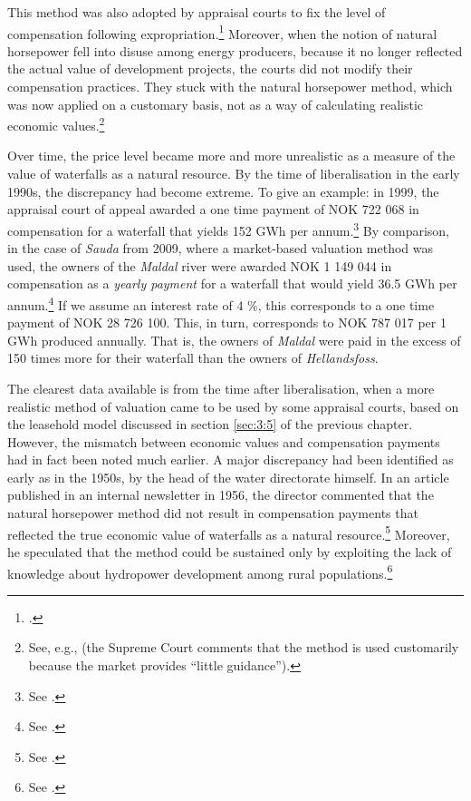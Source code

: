 This method was also adopted by appraisal courts to fix the level of compensation following expropriation.\footnote{\cite[521]{vislie02}.} Moreover, when the notion of natural horsepower fell into disuse among energy producers, because it no longer reflected the actual value of development projects, the courts did not modify their compensation practices. They stuck with the natural horsepower method, which was now applied on a customary basis, not as a way of calculating realistic economic values.\footnote{See, e.g., \cite[1599]{hellandsfoss99} (the Supreme Court comments that the method is used customarily because the market provides ``little guidance'').}

Over time, the price level became more and more unrealistic as a measure of the value of waterfalls as a natural resource. By the time of liberalisation in the early 1990s, the discrepancy had become extreme. To give an example: in 1999, the appraisal court of appeal awarded a one time payment of NOK 722 068 in compensation for a waterfall that yields 152 GWh per annum.\footnote{See \cite{hellandsfoss99}.} By comparison, in the case of {\it Sauda} from 2009, where a market-based valuation method was used, the owners of the {\it Maldal} river were awarded NOK 1 149 044 in compensation as a {\it yearly payment} for a waterfall that would yield 36.5 GWh per annum.\footnote{See \cite{sauda09}.} If we assume an interest rate of 4 \%, this corresponds to a one time payment of NOK 28 726 100. This, in turn, corresponds to NOK 787 017 per 1 GWh produced annually. That is, the owners of {\it Maldal} were paid in the excess of 150 times more for their waterfall than the owners of {\it Hellandsfoss}.

The clearest data available is from the time after liberalisation, when a more realistic method of valuation came to be used by some appraisal courts, based on the leasehold model discussed in section \ref{sec:3:5} of the previous chapter. However, the mismatch between economic values and compensation payments had in fact been noted much earlier. A major discrepancy had been identified as early as in the 1950s, by the head of the water directorate himself. In an article published in an internal newsletter in 1956, the director commented that the natural horsepower method did not result in compensation payments that reflected the true economic value of waterfalls as a natural resource.\footnote{See \cite{rogstad56}.} Moreover, he speculated that the method could be sustained only by exploiting the lack of knowledge about hydropower development among rural populations.\footnote{See \cite{rogstad56}.}

